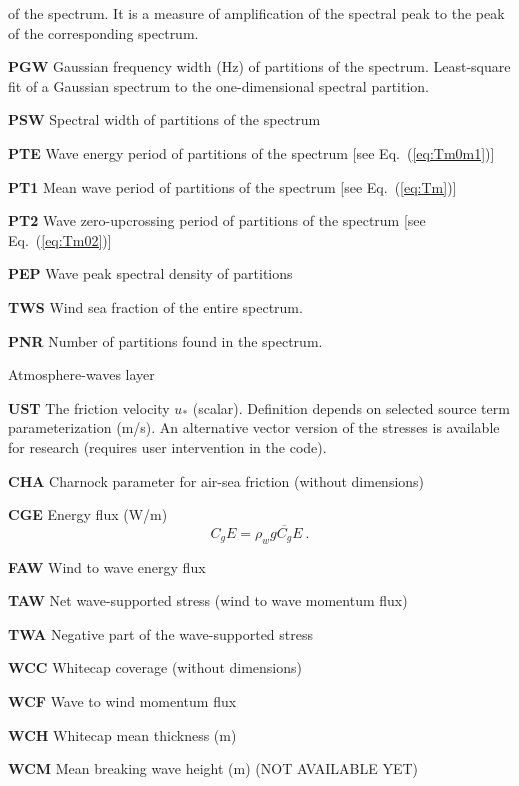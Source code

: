 \begin{list}{)\hfill}
\begin{list}{)\hfill}
      of the spectrum. It is a measure of amplification
      of the spectral peak to the peak of the corresponding
      \citeauthor{art:PM64} spectrum.
\item \textbf{PGW} Gaussian frequency width (Hz) of partitions of the spectrum.
      Least-square fit of a Gaussian spectrum to the one-dimensional spectral partition.
\item \textbf{PSW} Spectral width of partitions of the spectrum \citep{art:LH84}
\item \textbf{PTE} Wave energy period of partitions of the spectrum [see Eq.~(\ref{eq:Tm0m1})] 
\item \textbf{PT1} Mean wave period of partitions of the spectrum [see Eq.~(\ref{eq:Tm})] 
\item \textbf{PT2} Wave zero-upcrossing period of partitions of the spectrum [see Eq.~(\ref{eq:Tm02})]
\item \textbf{PEP} Wave peak spectral density of partitions
\item \textbf{TWS} Wind sea fraction of the entire spectrum.
\item \textbf{PNR} Number of partitions found in the spectrum. \label{out:last_part}
\end{list}


\item{Atmosphere-waves layer}
\begin{list}{)\hfill}
            { \leftmargin 8mm 
             \rightmargin 0mm \itemsep 0mm \parsep 0mm}
\item \textbf{UST}  The friction velocity $u_\ast$ (scalar). Definition depends on
      selected source term parameterization (m/s). An alternative vector version
      of the stresses is available for research (requires user intervention in
      the code).
\item \textbf{CHA}  Charnock parameter for air-sea friction (without dimensions)
\item \textbf{CGE} Energy flux (W/m)
      \begin{equation} C_g E =  \rho_w g \overline{C_g} E
      \: . \label{eq:CgE} \end{equation}
\item \textbf{FAW} Wind to wave energy flux
\item \textbf{TAW} Net wave-supported stress (wind to wave momentum flux) 
\item \textbf{TWA} Negative part of the wave-supported stress
\item \textbf{WCC} Whitecap coverage (without dimensions)
\item \textbf{WCF} Wave to wind momentum flux 
\item \textbf{WCH} Whitecap mean thickness (m) 
\item \textbf{WCM} Mean breaking wave height (m) (NOT AVAILABLE YET)
\end{list}


\end{list}
